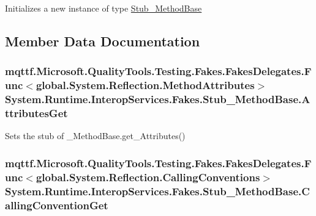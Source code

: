 Initializes a new instance of type \hyperlink{class_system_1_1_runtime_1_1_interop_services_1_1_fakes_1_1_stub___method_base}{Stub\-\_\-\-Method\-Base}



\subsection{Member Data Documentation}
\hypertarget{class_system_1_1_runtime_1_1_interop_services_1_1_fakes_1_1_stub___method_base_a096f51cd8927041491ff304730ae741c}{
\subsubsection[{Attributes\-Get}]{\setlength{\rightskip}{0pt plus 5cm}mqttf.\-Microsoft.\-Quality\-Tools.\-Testing.\-Fakes.\-Fakes\-Delegates.\-Func$<$global.\-System.\-Reflection.\-Method\-Attributes$>$ System.\-Runtime.\-Interop\-Services.\-Fakes.\-Stub\-\_\-\-Method\-Base.\-Attributes\-Get}}\label{class_system_1_1_runtime_1_1_interop_services_1_1_fakes_1_1_stub___method_base_a096f51cd8927041491ff304730ae741c}


Sets the stub of \-\_\-\-Method\-Base.\-get\-\_\-\-Attributes()

\hypertarget{class_system_1_1_runtime_1_1_interop_services_1_1_fakes_1_1_stub___method_base_a5838c0c4ab17780b1e1eacdf9e10e8d3}{
\subsubsection[{Calling\-Convention\-Get}]{\setlength{\rightskip}{0pt plus 5cm}mqttf.\-Microsoft.\-Quality\-Tools.\-Testing.\-Fakes.\-Fakes\-Delegates.\-Func$<$global.\-System.\-Reflection.\-Calling\-Conventions$>$ System.\-Runtime.\-Interop\-Services.\-Fakes.\-Stub\-\_\-\-Method\-Base.\-Calling\-Convention\-Get}}\label{class_system_1_1_runtime_1_1_interop_services_1_1_fakes_1_1_stub___method_base_a5838c0c4ab17780b1e1eacdf9e10e8d3}


